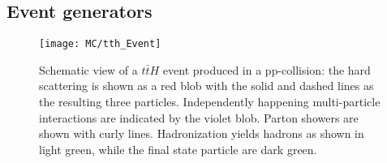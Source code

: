 \subsection{Event generators}

\begin{figure}[h]
\begin{center}
\texttt{[image: MC/tth\_Event]}
\end{center}
\caption{Schematic view of a $t\bar{t}H$ event produced in a pp-collision: the hard scattering is shown as a red blob with the solid and dashed lines as the resulting three particles.
Independently happening multi-particle interactions are indicated by the violet blob. 
Parton showers are shown with curly lines.
Hadronization yields hadrons as shown in light green, while the final state particle are dark green.
}
\end{figure}

